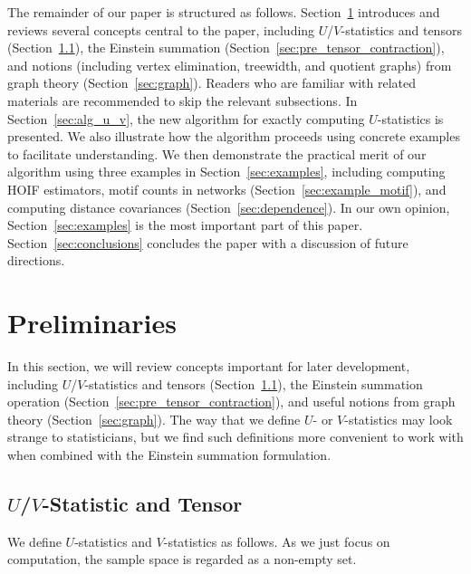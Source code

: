 \documentclass[letterpaper,11pt]{article}
\newcommand{\pdfu}{\texorpdfstring{$U$}{U}}
\newcommand{\pdfv}{\texorpdfstring{$V$}{V}}
\newcommand{\degp}[2]{\deg(#1,#2)}
\begin{document}
\begin{bibunit}[plainnat]

The remainder of our paper is structured as follows. Section~\ref{sec:preliminaries} introduces and reviews several concepts central to the paper, including $U$/$V$-statistics and tensors (Section~\ref{sec:pre_u_v}), the Einstein summation (Section~\ref{sec:pre_tensor_contraction}), and notions (including vertex elimination, treewidth, and quotient graphs) from graph theory (Section~\ref{sec:graph}). Readers who are familiar with related materials are recommended to skip the relevant subsections. In Section~\ref{sec:alg_u_v}, the new algorithm for exactly computing $U$-statistics is presented. We also illustrate how the algorithm proceeds using concrete examples to facilitate understanding. We then demonstrate the practical merit of our algorithm using three examples in Section~\ref{sec:examples}, including computing HOIF estimators, motif counts in networks (Section~\ref{sec:example_motif}), and computing distance covariances (Section~\ref{sec:dependence}). In our own opinion, Section~\ref{sec:examples} is the most important part of this paper. Section~\ref{sec:conclusions} concludes the paper with a discussion of future directions.

\section{Preliminaries}
\label{sec:preliminaries}

In this section, we will review concepts important for later development, including $U$/$V$-statistics and tensors (Section~\ref{sec:pre_u_v}), the Einstein summation operation (Section~\ref{sec:pre_tensor_contraction}), and useful notions from graph theory (Section~\ref{sec:graph}). The way that we define $U$- or $V$-statistics may look strange to statisticians, but we find such definitions more convenient to work with when combined with the Einstein summation formulation.

\subsection{\pdfu/\pdfv-Statistic and Tensor}\label{sec:pre_u_v}

We define $U$-statistics and $V$-statistics as follows. As we just focus on computation, the sample space is regarded as a non-empty set. 


\end{bibunit}
\end{document}
